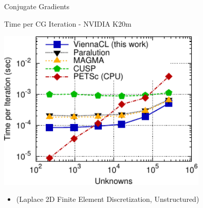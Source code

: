 
\begin{frame}[fragile]{Conjugate Gradients}
 \begin{block}{Time per CG Iteration - NVIDIA K20m}
 \begin{center}
  \vspace*{-0.01cm}
  \includegraphics[width=0.75\textwidth]{figures/time-laplace2d-K20m-cg-3-crop}
 \end{center}

 \begin{itemize}
  \item   \vspace*{-0.3cm} {\small (Laplace 2D Finite Element Discretization, Unstructured)}
 \end{itemize}
 \end{block}   
\end{frame}




